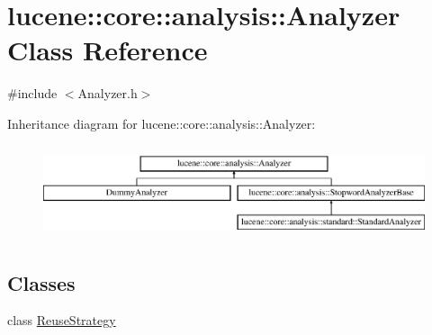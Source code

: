 \hypertarget{classlucene_1_1core_1_1analysis_1_1Analyzer}{}\section{lucene\+:\+:core\+:\+:analysis\+:\+:Analyzer Class Reference}
\label{classlucene_1_1core_1_1analysis_1_1Analyzer}


{\ttfamily \#include $<$Analyzer.\+h$>$}

Inheritance diagram for lucene\+:\+:core\+:\+:analysis\+:\+:Analyzer\+:\begin{figure}[H]
\begin{center}
\leavevmode
\includegraphics[height=2.754098cm]{classlucene_1_1core_1_1analysis_1_1Analyzer}
\end{center}
\end{figure}
\subsection*{Classes}
\begin{DoxyCompactItemize}
\item 
class \mbox{\hyperlink{classlucene_1_1core_1_1analysis_1_1Analyzer_1_1ReuseStrategy}{Reuse\+Strategy}}
\end{DoxyCompactItemize}

